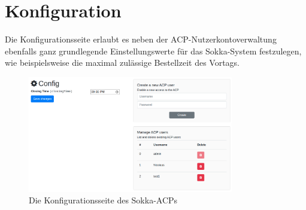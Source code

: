 \section{Konfiguration}

Die Konfigurationsseite erlaubt es neben der ACP-Nutzerkontoverwaltung ebenfalls ganz grundlegende Einstellungswerte für das Sokka-System festzulegen, wie beispielsweise die maximal zulässige Bestellzeit des Vortags.

\begin{figure}[ht]
    \centering
    \includegraphics[width=0.8\textwidth]{images/ACP/config.png}
    \caption{Die Konfigurationsseite des Sokka-ACPs}
\end{figure}
